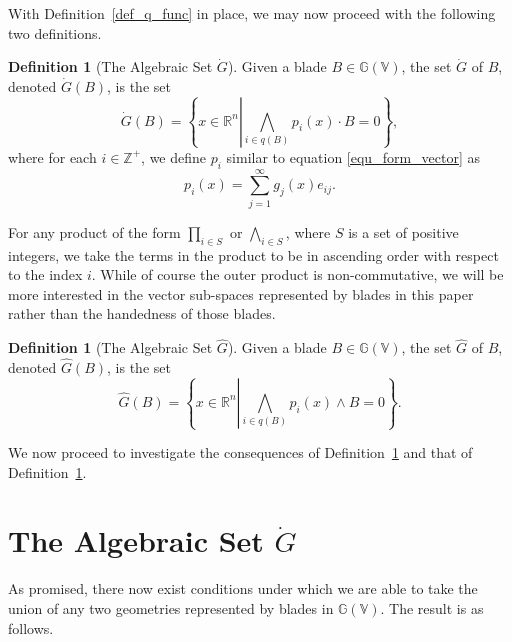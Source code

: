 \documentclass{birkjour}
\theoremstyle{definition}
\newtheorem{defn}[thm]{Definition}
\theoremstyle{remark}
\numberwithin{equation}{section}
\newcommand{\G}{\mathbb{G}}
\newcommand{\V}{\mathbb{V}}
\newcommand{\R}{\mathbb{R}}
\newcommand{\Z}{\mathbb{Z}}
\newcommand{\Gi}{\dot{G}}
\newcommand{\Go}{\hat{G}}
\begin{document}
With Definition~\ref{def_q_func} in place, we may now proceed with the following two definitions.

\begin{defn}[The Algebraic Set $\Gi$]\label{def_gi}
Given a blade $B\in\G(\V)$, the set $\Gi$ of $B$, denoted $\Gi(B)$, is the set
\begin{equation}
\Gi(B) = \left\{x\in\R^n\left|\bigwedge_{i\in q(B)} p_i(x)\cdot B=0\right.\right\},
\end{equation}
where for each $i\in\Z^+$, we define $p_i$ similar to equation \eqref{equ_form_vector} as
\begin{equation}\label{equ_pi_func}
p_i(x) = \sum_{j=1}^\infty g_j(x)e_{ij}.
\end{equation}
\end{defn}
For any product of the form $\prod_{i\in S}$ or $\bigwedge_{i\in S}$, where $S$ is
a set of positive integers, we take the terms in the product to be in ascending order
with respect to the index $i$.  While of course the outer product is non-commutative,
we will be more interested in the vector sub-spaces represented by blades in this
paper rather than the handedness of those blades.

\begin{defn}[The Algebraic Set $\Go$]\label{def_go}
Given a blade $B\in\G(\V)$, the set $\Go$ of $B$, denoted $\Go(B)$, is the set
\begin{equation}
\Go(B) = \left\{x\in\R^n\left|\bigwedge_{i\in q(B)}p_i(x)\wedge B=0\right.\right\}.
\end{equation}
\end{defn}

We now proceed to investigate the consequences of Definition~\ref{def_gi}
and that of Definition~\ref{def_go}.

\section{The Algebraic Set $\Gi$}

As promised, there now exist conditions under which we are able to take the
union of any two geometries represented by blades in $\G(\V)$.  The result is
as follows.
\end{document}
